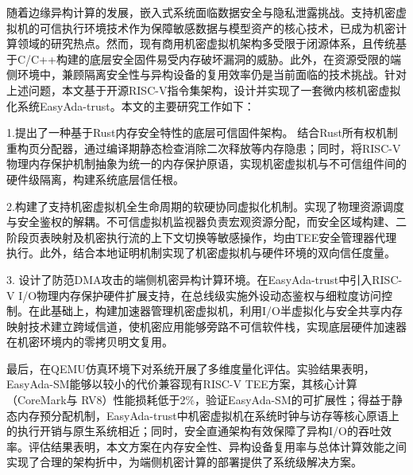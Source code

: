 \documentclass[master, vlined, review]{DissertUESTC}
\begin{document}
	
	\declaration[3cm]{}{}{}
	
	
	\zhabstract
	随着边缘异构计算的发展，嵌入式系统面临数据安全与隐私泄露挑战。支持机密虚拟机的可信执行环境技术作为保障敏感数据与模型资产的核心技术，已成为机密计算领域的研究热点。然而，现有商用机密虚拟机架构多受限于闭源体系，且传统基于C/C++构建的底层安全固件易受内存破坏漏洞的威胁。此外，在资源受限的端侧环境中，兼顾隔离安全性与异构设备的复用效率仍是当前面临的技术挑战。针对上述问题，本文基于开源RISC-V指令集架构，设计并实现了一套微内核机密虚拟化系统EasyAda-trust。本文的主要研究工作如下：
	
	1.提出了一种基于Rust内存安全特性的底层可信固件架构。 结合Rust所有权机制重构页分配器，通过编译期静态检查消除二次释放等内存隐患；同时，将RISC-V物理内存保护机制抽象为统一的内存保护原语，实现机密虚拟机与不可信组件间的硬件级隔离，构建系统底层信任根。
	
	2.构建了支持机密虚拟机全生命周期的软硬协同虚拟化机制。实现了物理资源调度与安全鉴权的解耦。不可信虚拟机监视器负责宏观资源分配，而安全区域构建、二阶段页表映射及机密执行流的上下文切换等敏感操作，均由TEE安全管理器代理执行。此外，结合本地证明机制实现了机密虚拟机与硬件环境的双向信任度量。
	
	3. 设计了防范DMA攻击的端侧机密异构计算环境。在EasyAda-trust中引入RISC-V I/O物理内存保护硬件扩展支持，在总线级实施外设动态鉴权与细粒度访问控制。在此基础上，构建加速器管理机密虚拟机，利用I/O半虚拟化与安全共享内存映射技术建立跨域信道，使机密应用能够旁路不可信软件栈，实现底层硬件加速器在机密环境内的零拷贝明文复用。
	
	最后，在QEMU仿真环境下对系统开展了多维度量化评估。实验结果表明，EasyAda-SM能够以较小的代价兼容现有RISC-V TEE方案，其核心计算（CoreMark与 RV8）性能损耗低于2\%，验证EasyAda-SM的可扩展性；得益于静态内存预分配机制，EasyAda-trust中机密虚拟机在系统时钟与访存等核心原语上的执行开销与原生系统相近；同时，安全直通架构有效保障了异构I/O的吞吐效率。评估结果表明，本文方案在内存安全性、异构设备复用率与总体计算效能之间实现了合理的架构折中，为端侧机密计算的部署提供了系统级解决方案。
	
\end{document}
